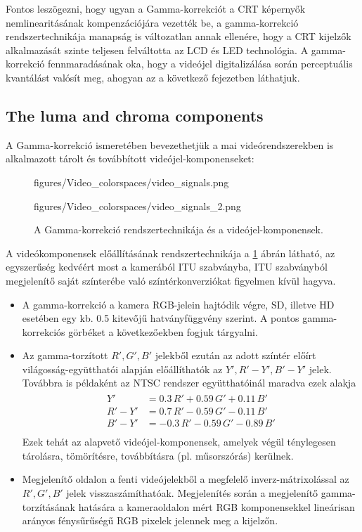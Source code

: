 \hspace{3mm}
Fontos leszögezni, hogy ugyan a Gamma-korrekciót a CRT képernyők nemlinearitásának kompenzációjára vezették be, a gamma-korrekció rendszertechnikája manapság is változatlan annak ellenére, hogy a CRT kijelzők alkalmazását szinte teljesen felváltotta az LCD és LED technológia.
A gamma-korrekció fennmaradásának oka, hogy a videójel digitalizálása során perceptuális kvantálást valósít meg, ahogyan az a következő fejezetben láthatjuk.

\subsection{The luma and chroma components}
A Gamma-korrekció ismeretében bevezethetjük a mai videórendszerekben is alkalmazott tárolt és továbbított videójel-komponenseket:
\begin{figure}[]
	\centering
	\begin{overpic}[width = 0.53\columnwidth ]{figures/Video_colorspaces/video_signals.png}
	\end{overpic}
	\hspace{2mm}
	\begin{overpic}[width = 0.44\columnwidth ]{figures/Video_colorspaces/video_signals_2.png}
	\end{overpic}
	\caption{A Gamma-korrekció rendszertechnikája és a videójel-komponensek.}
	\label{Fig:gamma_system}  
\end{figure}
A videókomponensek előállításának rendszertechnikája a \ref{Fig:gamma_system} ábrán látható, az egyszerűség kedvéért most a kamerából ITU szabványba, ITU szabványból megjelenítő saját színterébe való színtérkonverziókat figyelmen kívül hagyva.
\begin{itemize}
\item A gamma-korrekció a kamera RGB-jelein hajtódik végre, SD, illetve HD esetében egy kb. 0.5 kitevőjű hatványfüggvény szerint.
A pontos gamma-korrekciós görbéket a következőekben fogjuk tárgyalni.
\item Az gamma-torzított $R',G',B'$ jelekből ezután az adott színtér előírt világosság-együtthatói alapján előállíthatók az $Y', R'-Y', B'-Y'$ jelek.
Továbbra is példaként az NTSC rendszer együtthatóinál maradva ezek alakja
\begin{align}
\begin{split}
Y' &= 0.3 \, R' + 0.59 \, G' + 0.11 \, B' \\
R'-Y' &= 0.7 \, R' - 0.59 \, G' - 0.11 \, B' \\
B'-Y' &= -0.3 \, R' - 0.59 \, G' - 0.89 \, B' \\
\end{split}
\end{align}
Ezek tehát az alapvető videójel-komponensek, amelyek végül ténylegesen tárolásra, tömörítésre, továbbításra (pl. műsorszórás) kerülnek.
\item Megjelenítő oldalon a fenti videójelekből a megfelelő inverz-mátrixolással az $R', G', B'$ jelek visszaszámíthatóak.
Megjelenítés során a megjelenítő gamma-torzításának hatására a kameraoldalon mért RGB komponensekkel lineárisan arányos fénysűrűségű RGB pixelek jelennek meg a kijelzőn.
\end{itemize}
